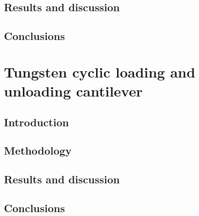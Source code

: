 \subsection{Results and discussion}
\subsection{Conclusions}

\section{Tungsten cyclic loading and unloading cantilever}\label{s:tungstenCyclic}
\subsection{Introduction}
\subsection{Methodology}
\subsection{Results and discussion}
\subsection{Conclusions}


